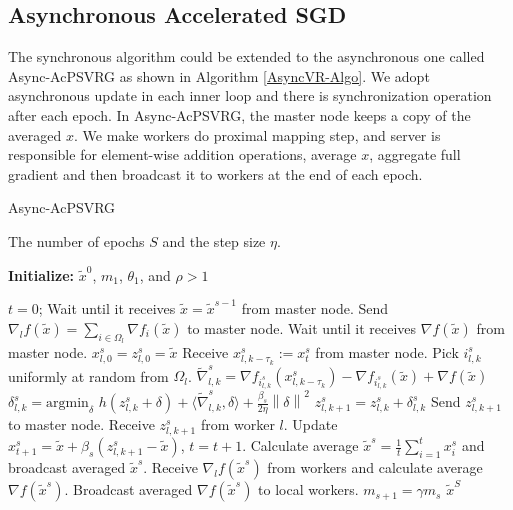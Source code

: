 \documentclass{article}
\newcommand{\norm}[1]{\left\lVert#1\right\rVert}
\renewcommand{\algorithmicrequire}{
\textbf{Input:}}
\renewcommand{\algorithmicensure}{\textbf{Output:}}
\theoremstyle{definition}
\theoremstyle{remark}
\begin{document}
\subsection{Asynchronous Accelerated SGD}

The  synchronous algorithm could be extended to the asynchronous one called Async-AcPSVRG  as shown in Algorithm \ref{AsyncVR-Algo}. We adopt asynchronous update in each inner loop and there is synchronization operation after each epoch. In Async-AcPSVRG, the  master node keeps a copy of the averaged $x$. We make workers do proximal mapping step, and server is responsible for element-wise addition operations, average $x$, aggregate full gradient and then broadcast it to workers at the end of each epoch. 
\begin{algorithm}[H]
\caption{Async-AcPSVRG}\label{AsyncVR-Algo}
\begin{algorithmic}
\renewcommand{\algorithmicrequire}{\textbf{Input:}}
 \renewcommand{\algorithmicensure}{\textbf{Output:}}
  \newcommand{\INITIALIZE}{\item[\textbf{Initialize:}]}
\REQUIRE The number of epochs $S$ and the step size $\eta$.
\INITIALIZE  $\widetilde{x}^0$, $m_1$, $\theta_1$, and $\rho > 1$

\STATE $t=0$;
\STATE Wait until it receives $\widetilde{x} = \widetilde{x}^{s-1}$ from master node.
\STATE  Send $\nabla_l f(\widetilde{x}) = \sum_{i\in\Omega_l}\nabla f_i(\widetilde{x})$ to master node.
\STATE  Wait until it receives $\nabla f(\widetilde{x})$ from master node.
\STATE $x_{l,0}^s = z_{l,0}^s = \widetilde{x}$
 \STATE Receive $x_{l,k-\tau_k}^s:=x_{t}^s$ from master node.
 \STATE Pick $i_{l,k}^s$ uniformly at random from $\Omega_l$.
 \STATE $\widetilde{\nabla}_{l,k}^s = \nabla f_{i_{l,k}^s}(x_{l,k-\tau_k}^s) - \nabla f_{i_{l,k}^s}(\widetilde{x}) + \nabla f(\widetilde{x})$
 \STATE $\delta_{l,k}^s = \text{argmin}_{\delta}\,\,h(z_{l,k}^s+\delta)+\langle\widetilde{\nabla}_{l,k}^s,\delta\rangle + \frac{{\beta_s}}{2\eta}\norm{\delta}^2$
 \STATE $z_{l,k+1}^s = z_{l,k}^s + \delta_{l,k}^s$
 \STATE Send $z_{l,k+1}^s$ to master node.
 \STATE Receive $z_{l,k+1}^s$ from worker $l$. 
  \STATE Update $x^s_{t+1} = \widetilde{x}+\beta_s(z_{l,k+1}^s-\widetilde{x})$, $t=t+1$.
  \ENDFOR
   \STATE Calculate average $\widetilde{x}^s = \frac{1}{t}\sum_{i=1}^{t} x_{i}^s$ and broadcast averaged $\widetilde{x}^s$. 
  \STATE Receive $\nabla_l f(\widetilde{x}^s)$ from workers and calculate average $\nabla f(\widetilde{x}^s)$.
  \STATE Broadcast averaged $\nabla f(\widetilde{x}^s)$ to local workers.
  \STATE $m_{s+1} = \gamma m_s$
  \ENDFOR
 \ENSURE $\widetilde{x}^S$
\end{algorithmic}
\end{algorithm}
\end{document}
